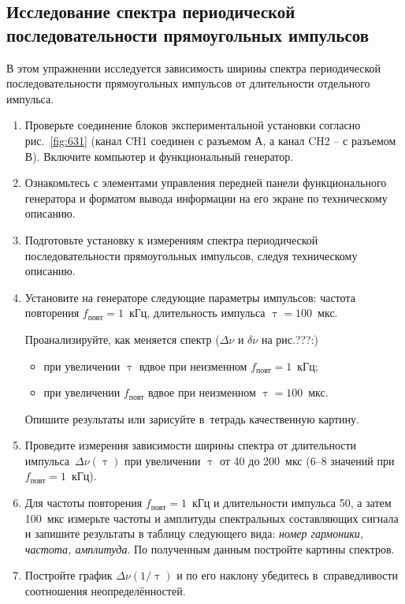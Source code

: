 \begin{lab:task}
\subsection*{Исследование спектра периодической последовательности
прямоугольных импульсов}

В этом упражнении исследуется зависимость ширины спектра периодической последовательности прямоугольных импульсов от длительности отдельного импульса.

\begin{enumerate}
	\item Проверьте соединение блоков экспериментальной установки согласно рис.~\ref{fig:631} (канал CH1 соединен с разъемом А, а канал CH2 – с разъемом В). Включите компьютер и функциональный генератор.
	\item Ознакомьтесь с элементами управления передней панели функционального генератора и форматом вывода информации на его экране по техническому описанию.
	\item Подготовьте установку к измерениям спектра периодической последовательности прямоугольных импульсов, следуя техническому описанию.
	\item Установите на генераторе следующие параметры импульсов: частота повторения $f_{\text{повт}}=1$~кГц, длительность импульса $\uptau=100$~мкс.

	Проанализируйте, как меняется спектр ($\Delta\nu$ и $\delta\nu$ на рис.???:)
	\begin{itemize}
		\item при увеличении $\uptau$ вдвое при неизменном $f_{\text{повт}}=1$~кГц;
		\item  при увеличении $f_{\text{повт}}$ вдвое при неизменном $\uptau=100$~мкс.
	\end{itemize}
	
	Опишите результаты или зарисуйте в~тетрадь качественную картину.
	
%
	\item Проведите измерения зависимости ширины спектра от длительности импульса~$\Delta \nu(\uptau)$ при увеличении $\uptau$ от 40 до 200~мкс (6--8 значений при $f_{\text{повт}}=1$~кГц).
	\item\label{task:rect_spectrum} Для частоты повторения $f_{\text{повт}} = 1$~кГц и длительности импульса 50, а затем 100~мкс измерьте частоты и амплитуды спектральных составляющих сигнала и запишите результаты в таблицу следующего вида: \emph{номер гармоники, частота, амплитуда}. По полученным данным постройте картины спектров.
	\item Постройте график $\Delta \nu(1/\uptau)$ и по его наклону убедитесь в~справедливости соотношения неопределённостей.
\end{enumerate}


\end{lab:task}
